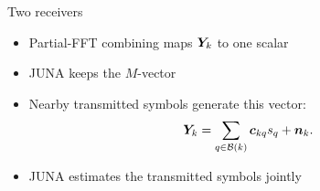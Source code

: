 \documentclass[aspectratio=169,10pt]{beamer}
\begin{document}
\begin{frame}{Two receivers}
\begin{itemize}\setlength{\itemsep}{0.5em}
  \item Partial-FFT combining maps $\bm{Y}_k$ to one scalar
  \item JUNA keeps the $M$-vector
  \item Nearby transmitted symbols generate this vector:
  \[
    \bm{Y}_k=\sum_{q\in\mathcal B(k)}\bm c_{kq}s_q+\bm{n}_k .
  \]
  \item JUNA estimates the transmitted symbols jointly
\end{itemize}
\end{frame}
\end{document}
